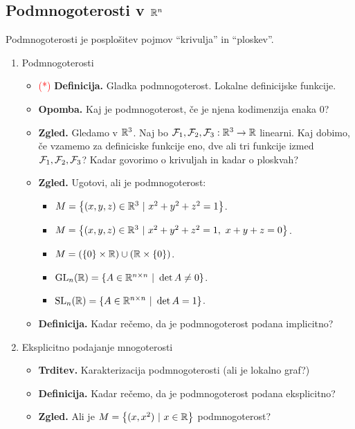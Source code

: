 \subsection{Podmnogoterosti v $\mathbb{R}^n$}
Podmnogoterosti je posplošitev pojmov "`krivulja"' in "`ploskev"'.
\begin{enumerate}
    \item Podmnogoterosti
    \begin{itemize}
        \item \textcolor{red}{(*)} \textbf{Definicija.} Gladka podmnogoterost. Lokalne definicijske funkcije.
        \item \textbf{Opomba.} Kaj je podmnogoterost, če je njena kodimenzija enaka $0$?
        \item \textbf{Zgled.} Gledamo v $\mathbb{R}^3$. Naj bo $\mathcal{F}_1, \mathcal{F}_2, \mathcal{F}_3: \mathbb{R}^3 \to \mathbb{R}$ linearni. Kaj dobimo, če vzamemo za definiciske funkcije eno, dve ali tri funkcije izmed $\mathcal{F}_1, \mathcal{F}_2, \mathcal{F}_3$? Kadar govorimo o krivuljah in kadar o ploskvah?
        \item \textbf{Zgled.} Ugotovi, ali je podmnogoterost:
        \begin{itemize}
            \item $M = \left\{(x,y,z) \in \mathbb{R}^3 \ | \ x^2+y^2+z^2 = 1\right\}$.
            \item $M = \left\{(x,y,z) \in \mathbb{R}^3 \ | \ x^2+y^2+z^2 = 1, \ x+y+z = 0\right\}$.
            \item $M = (\left\{0\right\} \times \mathbb{R}) \cup (\mathbb{R} \times \left\{0\right\})$.
            \item $\operatorname{GL}_n(\mathbb{R}) = \left\{A \in \mathbb{R}^{n \times n} \ | \ \det A \neq 0\right\}$.
            \item $\operatorname{SL}_n(\mathbb{R}) = \left\{A \in \mathbb{R}^{n \times n} \ | \ \det A = 1\right\}$.
        \end{itemize}
        \item \textbf{Definicija.} Kadar rečemo, da je podmnogoterost podana implicitno?
    \end{itemize}

    \item Eksplicitno podajanje mnogoterosti
    \begin{itemize}
        \item \textbf{Trditev.} Karakterizacija podmnogoterosti (ali je lokalno graf?)
        \item \textbf{Definicija.} Kadar rečemo, da je podmnogoterost podana eksplicitno?
        \item \textbf{Zgled.} Ali je $M = \left\{(x, x^2) \ | \ x \in \mathbb{R}\right\}$ podmnogoterost?
    \end{itemize}


\end{enumerate}
